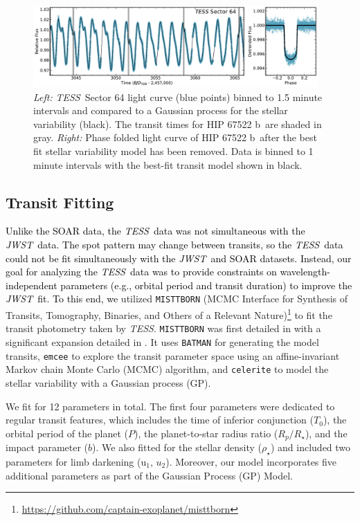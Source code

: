 \documentclass[twocolumn]{aastex63} %
\newcommand{\tess}{\textit{TESS}}
\newcommand{\jwst}{\textit{JWST}}
\newcommand{\plname}{HIP 67522 b}
\newcommand{\newedit}[1]{\textcolor{black}{#1}}
\begin{document}
\begin{figure}[ht]
    \centering
    \includegraphics[width=0.970\textwidth]{HIP67522b_TESS_lightcurve_GP.pdf}
    \caption{\textit{Left: } 
    \tess\, Sector 64 light curve (blue points) binned to 1.5 minute intervals and compared to a Gaussian process for the stellar variability (black). The transit times for \plname\ are shaded in gray. \textit{Right: } Phase folded light curve of \plname\, after the best fit stellar variability model has been removed. Data is binned to 1 minute intervals with the best-fit transit model shown in black. \label{fig:tesstransit}}
\end{figure} 


\subsection{Transit Fitting}

\newedit{Unlike the SOAR data, the \tess\ data was not simultaneous with the \jwst\ data. The spot pattern may change between transits, so the \tess\ data could not be fit simultaneously with the \jwst\ and SOAR datasets. Instead, our goal for analyzing the \tess\ data was to provide constraints on wavelength-independent parameters (e.g., orbital period and transit duration) to improve the \jwst\ fit. To this end, 
we} utilized \texttt{MISTTBORN} (MCMC Interface for Synthesis of Transits, Tomography, Binaries, and Others of a Relevant Nature)\footnote{\url{https://github.com/captain-exoplanet/misttborn}} to fit the transit photometry taken by \tess. \texttt{MISTTBORN} was first detailed in \citet{Mann2016a} with a significant expansion detailed in \citet{MISTTBORN}. It uses \texttt{BATMAN} \citep{Kreidberg2015} for generating the model transits, \texttt{emcee} \citep{Foreman-Mackey2013} to explore the transit parameter space using an affine-invariant Markov chain Monte Carlo (MCMC) algorithm, and \texttt{celerite} \citep{celerite} to model the stellar variability with a Gaussian process (GP). 

We fit for 12 parameters in total. The first four parameters were dedicated to regular transit features, which includes the time of inferior conjunction ($T_0$), the orbital period of the planet ($P$), the planet-to-star radius ratio ($R_p/R_\star$), and the impact parameter ($b$). We also fitted for the stellar density ($\rho_\star$) and included two parameters for limb darkening (u$_{1}$, $u_{2}$). Moreover, our model incorporates five additional parameters as part of the Gaussian Process (GP) Model. 
\end{document}

